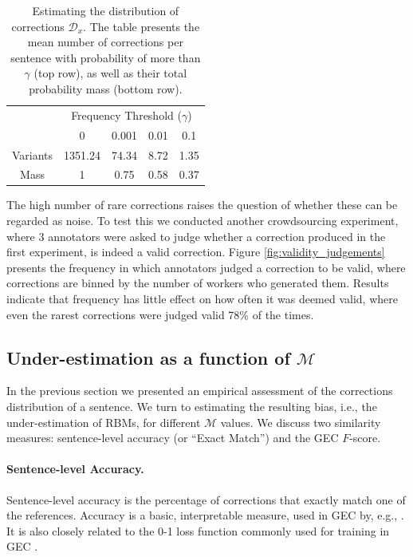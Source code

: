 \documentclass[letterpaper, 11pt]{article}
\begin{document}
\begin{table}[h!]
	\vspace{-0.5cm}
  \centering
  \small
  \singlespacing
  \begin{tabular}{c|c|c|c|c|}
    & \multicolumn{4}{c|}{Frequency Threshold ($\gamma$)}\\ 
    & \multicolumn{1}{c}{0} & \multicolumn{1}{c}{0.001} & \multicolumn{1}{c}{0.01} & \multicolumn{1}{c|}{0.1}
    \\
    \hline
    Variants & 1351.24 & 74.34 & 8.72 & 1.35
    \\
    Mass & 1 & 0.75 & 0.58 & 0.37\\
    \hline
  \end{tabular}
  \caption{\label{tab:corrections_dist}
    Estimating the distribution of corrections $\mathcal{D}_x$.
    The table presents the mean number of corrections per sentence with probability of more than
    $\gamma$ (top row), as well as their total probability mass (bottom row).
  }
  \vspace{-0.3cm}
\end{table}

The high number of rare corrections raises the question of whether these can be regarded as noise.
To test this we conducted another crowdsourcing experiment, where 3 annotators were asked to judge whether a correction produced in the first experiment, is indeed a valid correction.
Figure \ref{fig:validity_judgements} presents the frequency in which annotators judged a correction to be valid, where corrections are binned by the number of workers who generated them.
Results indicate that frequency has little effect on how often it was deemed valid, where even the rarest corrections were judged valid 78\% of the times.

\subsection{Under-estimation as a function of $\mathcal{M}$} \label{subsec:Assessment-values}
In the previous section we presented an empirical assessment of the corrections distribution of a sentence. We turn to estimating the resulting bias, i.e., the under-estimation of RBMs, for different $\mathcal{M}$ values. 
We discuss two similarity measures: sentence-level accuracy
(or ``Exact Match'') and the GEC $F$-score.

\paragraph{Sentence-level Accuracy.}
Sentence-level accuracy is the percentage of corrections that
exactly match one of the references.
Accuracy is a basic, interpretable measure, used in GEC by, e.g., .
It is also closely related to the 0-1 loss function commonly used
for training in GEC \cite{chodorow2012problems,rozovskaya2013joint}. 
\end{document}
